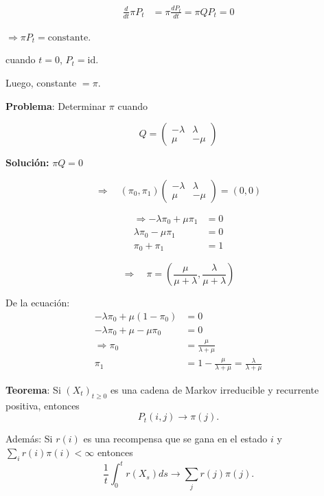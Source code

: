 \documentclass[12pt,a4paper]{article}
\newcommand{\teorema}[1]{%
\begin{teoremabox}
\textbf{Teorema}: #1
\end{teoremabox}
}
\begin{document}
\begin{align*}
\frac{d}{dt} \pi P_t &= \pi \frac{dP_t}{dt} = \pi Q P_t = 0
\end{align*}

$\Rightarrow \pi P_t = \text{constante}$.

cuando $t = 0$, $P_t = \text{id}$.

Luego, constante $= \pi$.


\textbf{Problema}: Determinar $\pi$ cuando

\begin{equation*}
Q = \begin{pmatrix}
-\lambda & \lambda \\
\mu & -\mu
\end{pmatrix}
\end{equation*}

\textbf{Solución:} $\pi Q = 0$

\begin{equation*}
\Rightarrow \quad (\pi_0, \pi_1) \begin{pmatrix}
-\lambda & \lambda \\
\mu & -\mu
\end{pmatrix} = (0, 0)
\end{equation*}

\begin{align*}
\Rightarrow -\lambda \pi_0 + \mu \pi_1 &= 0 \\
\lambda \pi_0 - \mu \pi_1 &= 0 \\
\pi_0 + \pi_1 &= 1
\end{align*}

\begin{equation*}
\Rightarrow \quad \pi = \left(\frac{\mu}{\mu + \lambda}, \frac{\lambda}{\mu + \lambda}\right)
\end{equation*}

De la ecuación:
\begin{align*}
-\lambda \pi_0 + \mu(1-\pi_0) &= 0 \\
-\lambda \pi_0 + \mu - \mu\pi_0 &= 0 \\
\Rightarrow \pi_0 &= \frac{\mu}{\lambda + \mu} \\
\pi_1 &= 1 - \frac{\mu}{\lambda + \mu} = \frac{\lambda}{\lambda + \mu}
\end{align*}

\teorema{Si $(X_t)_{t \geq 0}$ es una cadena de Markov irreducible y recurrente positiva, entonces
\begin{equation*}
P_t(i,j) \to \pi(j).
\end{equation*}

Además: Si $r(i)$ es una recompensa que se gana en el estado $i$ y $\sum_i r(i) \pi(i) < \infty$ entonces
\begin{equation*}
\frac{1}{t} \int_0^t r(X_s) ds \to \sum_j r(j) \pi(j).
\end{equation*}}
\end{document}
